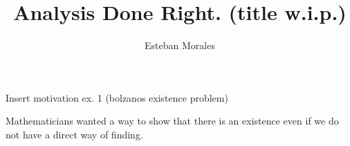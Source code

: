 \documentclass[12pt]{article}
\theoremstyle{definition}
\newenvironment{statement}[2][Section]{\begin{trivlist}
\item[\hskip \labelsep {\bfseries #1}\hskip \labelsep {\bfseries #2.}]}{\end{trivlist}}
\begin{document}
\newtheorem{theorem}{Theorem} 
%
%
 
\title{Analysis Done Right. (title w.i.p.)} %
\author{Esteban Morales} %
\maketitle


\begin{statement}{Chapter 1} %

Insert motivation ex. 1 (bolzanos existence problem)

Mathematicians wanted a way to show that there is an existence even if we do not have a 
direct way of finding.






\end{statement}
 
\end{document}
